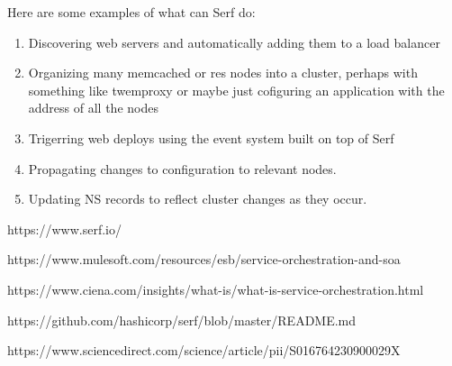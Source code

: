 \documentclass[12pt, oneside]{article}
\begin{document}
	Here are some examples of what can Serf do:
	\begin{enumerate}
	\item Discovering web servers and automatically adding them to a load balancer \\
	\item Organizing many memcached or res nodes into a cluster, perhaps with something like twemproxy or maybe just cofiguring an application with the address of all the nodes \\ 
	\item Trigerring web deploys using the event system built on top of Serf \\
	\item Propagating changes to configuration to relevant nodes. \\
	\item Updating NS records to reflect cluster changes as they occur.
	\end{enumerate}
\newpage

\begin{thebibliography}{9}
https://www.serf.io/

https://www.mulesoft.com/resources/esb/service-orchestration-and-soa

https://www.ciena.com/insights/what-is/what-is-service-orchestration.html

https://github.com/hashicorp/serf/blob/master/README.md

https://www.sciencedirect.com/science/article/pii/S016764230900029X

\end{thebibliography}	
	
\end{document}
